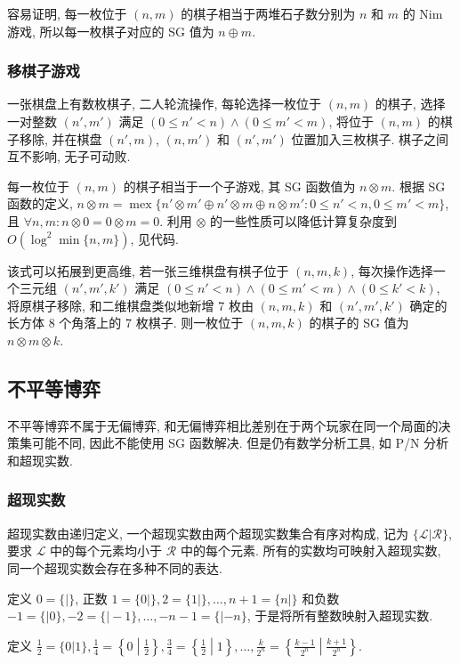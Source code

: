 容易证明, 每一枚位于 $(n,m)$ 的棋子相当于两堆石子数分别为 $n$ 和 $m$ 的 Nim 游戏, 所以每一枚棋子对应的 SG 值为 $n\oplus m$.

\subsubsection{移棋子游戏 \uppercase\expandafter{}}
一张棋盘上有数枚棋子, 二人轮流操作, 每轮选择一枚位于 $(n,m)$ 的棋子, 选择一对整数 $(n',m')$ 满足 $(0\le n'<n)\land(0\le m'<m)$, 将位于 $(n,m)$ 的棋子移除, 并在棋盘 $(n',m)$, $(n,m')$ 和 $(n',m')$ 位置加入三枚棋子. 棋子之间互不影响, 无子可动败.

每一枚位于 $(n,m)$ 的棋子相当于一个子游戏, 其 SG 函数值为 $n\otimes m$. 根据 SG 函数的定义, $n\otimes m=\operatorname{mex}\{n'\otimes m'\oplus n'\otimes m\oplus n\otimes m':0\le n'<n,0\le m'<m\}$, 且 $\forall n,m:n\otimes0=0\otimes m=0$. 利用 $\otimes$ 的一些性质可以降低计算复杂度到 $O(\log^2\min\{n,m\})$, 见代码.

该式可以拓展到更高维, 若一张三维棋盘有棋子位于 $(n,m,k)$, 每次操作选择一个三元组 $(n',m',k')$ 满足 $(0\le n'<n)\land(0\le m'<m)\land(0\le k'<k)$, 将原棋子移除, 和二维棋盘类似地新增 7 枚由 $(n,m,k)$ 和 $(n',m',k')$ 确定的长方体 8 个角落上的 7 枚棋子. 则一枚位于 $(n,m,k)$ 的棋子的 SG 值为 $n\otimes m\otimes k$.



\subsection{不平等博弈}

不平等博弈不属于无偏博弈, 和无偏博弈相比差别在于两个玩家在同一个局面的决策集可能不同, 因此不能使用 SG 函数解决. 但是仍有数学分析工具, 如 P/N 分析和超现实数.

\subsubsection{超现实数}

超现实数由递归定义, 一个超现实数由两个超现实数集合有序对构成, 记为 $\{\mathcal L|\mathcal R\}$, 要求 $\mathcal L$ 中的每个元素均小于 $\mathcal R$ 中的每个元素. 所有的实数均可映射入超现实数, 同一个超现实数会存在多种不同的表达.

定义 $0=\{|\}$, 正数 $1=\{0|\},2=\{1|\},\dots,n+1=\{n|\}$ 和负数 $-1=\{|0\},-2=\{|-1\},\dots,-n-1=\{|-n\}$, 于是将所有整数映射入超现实数.

定义 $\displaystyle\frac12=\{0|1\},\frac14=\left\{0\middle|\frac12\right\},\frac34=\left\{\frac12\middle|1\right\},\dots,\frac k{2^n}=\left\{\frac{k-1}{2^n}\middle|\frac{k+1}{2^n}\right\}$.

